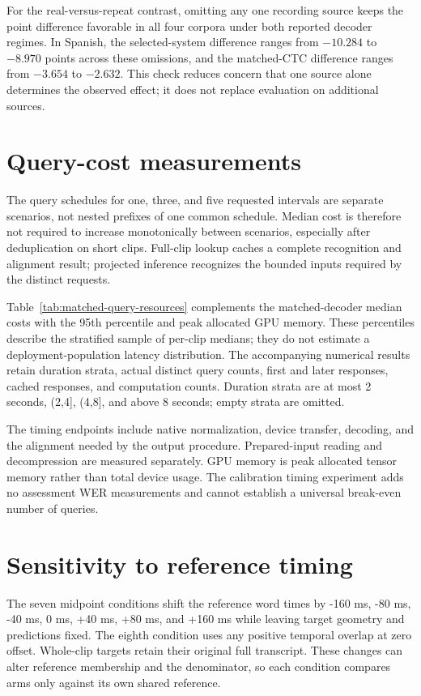 For the real-versus-repeat contrast, omitting any one recording source keeps
the point difference favorable in all four corpora under both reported
decoder regimes. In Spanish, the selected-system difference ranges from
$-10.284$ to $-8.970$ points across these omissions, and the matched-CTC
difference ranges from $-3.654$ to $-2.632$. This check reduces concern that
one source alone determines the observed effect; it does not replace
evaluation on additional sources.

\section{Query-cost measurements}


The query schedules for one, three, and five requested intervals are separate
scenarios, not nested prefixes of one common schedule. Median cost is therefore
not required to increase monotonically between scenarios, especially after
deduplication on short clips. Full-clip lookup caches a complete recognition
and alignment result; projected inference recognizes the bounded inputs
required by the distinct requests.

Table~\ref{tab:matched-query-resources} complements the matched-decoder
median costs with the 95th percentile and peak allocated GPU memory.
These percentiles describe the stratified sample of per-clip medians;
they do not estimate a deployment-population latency distribution.
The accompanying numerical results retain duration strata, actual distinct
query counts, first and later responses, cached responses, and computation
counts. Duration strata are at most 2 seconds, (2,4], (4,8], and above
8 seconds; empty strata are omitted.

The timing endpoints include native normalization, device transfer, decoding,
and the alignment needed by the output procedure. Prepared-input reading and
decompression are measured separately. GPU memory is peak allocated tensor
memory rather than total device usage. The calibration timing experiment adds
no assessment WER measurements and cannot establish a universal break-even
number of queries.

\section{Sensitivity to reference timing}

The seven midpoint conditions shift the reference word times by -160 ms,
-80 ms, -40 ms, 0 ms, +40 ms, +80 ms, and +160 ms while leaving target
geometry and predictions fixed. The eighth condition uses any positive temporal
overlap at zero offset.
Whole-clip targets retain their original full transcript.
These changes can alter reference membership and the denominator, so each
condition compares arms only against its own shared reference.

